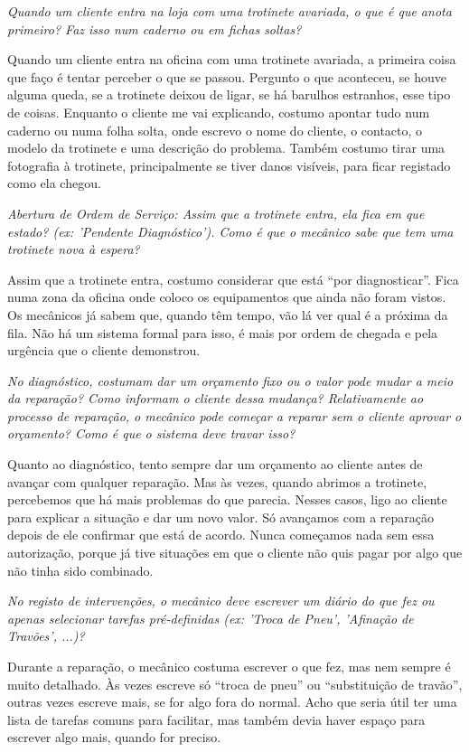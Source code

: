 \documentclass[11pt,a4paper]{article}
\newcommand{\pergunta}[1]{\item[P:] \textit{#1}}
\newcommand{\resposta}[1]{\item[R:] #1}
\begin{document}
\begin{transcription}
		\pergunta{Quando um cliente entra na loja com uma trotinete avariada, o que é que anota primeiro? Faz isso num caderno ou em fichas soltas?}
		\resposta{Quando um cliente entra na oficina com uma trotinete avariada, a primeira coisa que faço é tentar perceber o que se passou. Pergunto o que aconteceu, se houve alguma queda, se a trotinete deixou de ligar, se há barulhos estranhos, esse tipo de coisas. Enquanto o cliente me vai explicando, costumo apontar tudo num caderno ou numa folha solta, onde escrevo o nome do cliente, o contacto, o modelo da trotinete e uma descrição do problema. Também costumo tirar uma fotografia à trotinete, principalmente se tiver danos visíveis, para ficar registado como ela chegou.}

		\pergunta{Abertura de Ordem de Serviço: Assim que a trotinete entra, ela fica em que estado? (ex: 'Pendente Diagnóstico'). Como é que o mecânico sabe que tem uma trotinete nova à espera?}
		\resposta{Assim que a trotinete entra, costumo considerar que está “por diagnosticar”. Fica numa zona da oficina onde coloco os equipamentos que ainda não foram vistos. Os mecânicos já sabem que, quando têm tempo, vão lá ver qual é a próxima da fila. Não há um sistema formal para isso, é mais por ordem de chegada e pela urgência que o cliente demonstrou.}
		
		\pergunta{No diagnóstico, costumam dar um orçamento fixo ou o valor pode mudar a meio da reparação? Como informam o cliente dessa mudança? Relativamente ao processo de reparação, o mecânico pode começar a reparar sem o cliente aprovar o orçamento? Como é que o sistema deve travar isso?}
		\resposta{Quanto ao diagnóstico, tento sempre dar um orçamento ao cliente antes de avançar com qualquer reparação. Mas às vezes, quando abrimos a trotinete, percebemos que há mais problemas do que parecia. Nesses casos, ligo ao cliente para explicar a situação e dar um novo valor. Só avançamos com a reparação depois de ele confirmar que está de acordo. Nunca começamos nada sem essa autorização, porque já tive situações em que o cliente não quis pagar por algo que não tinha sido combinado.}
		
		\pergunta{No registo de intervenções, o mecânico deve escrever um diário do que fez ou apenas selecionar tarefas pré-definidas (ex: 'Troca de Pneu', 'Afinação de Travões', ...)?}
		\resposta{Durante a reparação, o mecânico costuma escrever o que fez, mas nem sempre é muito detalhado. Às vezes escreve só “troca de pneu” ou “substituição de travão”, outras vezes escreve mais, se for algo fora do normal. Acho que seria útil ter uma lista de tarefas comuns para facilitar, mas também devia haver espaço para escrever algo mais, quando for preciso.}
	

\end{transcription}
\end{document}
